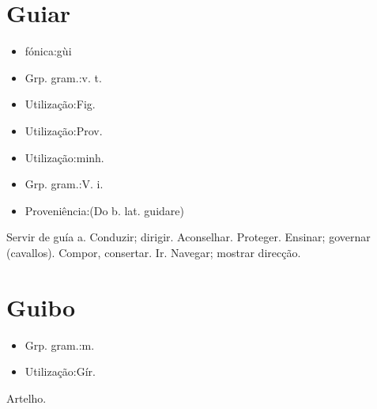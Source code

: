 \section{Guiar}
\begin{itemize}
\item {fónica:gùi}
\end{itemize}
\begin{itemize}
\item {Grp. gram.:v. t.}
\end{itemize}
\begin{itemize}
\item {Utilização:Fig.}
\end{itemize}
\begin{itemize}
\item {Utilização:Prov.}
\end{itemize}
\begin{itemize}
\item {Utilização:minh.}
\end{itemize}
\begin{itemize}
\item {Grp. gram.:V. i.}
\end{itemize}
\begin{itemize}
\item {Proveniência:(Do b. lat. \textunderscore guidare\textunderscore )}
\end{itemize}
Servir de guía a.
Conduzir; dirigir.
Aconselhar.
Proteger.
Ensinar; governar (cavallos).
Compor, consertar.
Ir.
Navegar; mostrar direcção.
\section{Guibo}
\begin{itemize}
\item {Grp. gram.:m.}
\end{itemize}
\begin{itemize}
\item {Utilização:Gír.}
\end{itemize}
Artelho.
